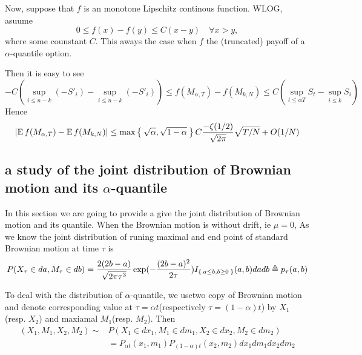 \documentclass[11pt]{book}
\def\abs#1{{\left|#1\right|}}
\def\E{{\mathrm{E}\,}}
\begin{document}
Now, suppose that $f$ is an monotone Lipschitz continous function.
WLOG, asuume 
\begin{equation}\label{eq:lips}
0 \leq f(x)-f(y) \leq C (x-y) \quad \forall x>y,
\end{equation}
where some counstant $C$. This aways the case when $f$ the 
(truncated) payoff of a $\alpha$-quantile option.

Then it is easy to see
\[
-C\left( \sup_{i\leq n-k} (-S'_i)-\sup_{i\leq n-k} (-S'_i)\right)
 \leq f(M_{\alpha,T}) - f(M_{k,N}) 
\leq  C \left(\sup_{t\leq \alpha{T}} S_t - \sup_{i\leq k} S_i\right)
\]
Hence 
\[
\abs{\E f(M_{\alpha,T}) - \E f(M_{k,N})} 
\leq \max\Set{\sqrt{\alpha}, \sqrt{1-\alpha}}
C\frac{-\zeta(1/2)}{\sqrt{2\pi}}\sqrt{T/N}  + O(1/N)
\]


\subsection{a study of the joint distribution of Brownian motion and its $\alpha$-quantile}
In this section we are going to provide a give the joint distribution of Brownian motion and its quantile. When the Brownian motion is without drift, 
ie $\mu = 0 $, 
As we know the joint distribution of runing maximal and end point of 
standard Brownian motion at time $\tau$ is 
\[
P(X_\tau\in da, M_\tau\in db) =  
\frac{2(2b-a)}{\sqrt{2\pi \tau^3}} \exp(-\frac{(2b-a)^2}{2\tau}) 
I_{\Set{a\leq b, b\geq 0}} (a,b) da db \triangleq p_\tau(a,b)
\] 

To deal with the distribution of $\alpha$-quantile, we usetwo copy of 
Brownian motion and denote corresponding value at 
$\tau=\alpha t$(respectively $\tau=(1-\alpha) t$) by $X_1$(resp. $X_2$) and
maxiamal $M_1$(resp. $M_2$). 
Then 
\[
\begin{split}
(X_1,M_1, X_2, M_2) \sim& P(X_1\in dx_1, M_1\in dm_1, X_2\in dx_2, M_2\in dm_2)\\
&= P_{\alpha t}(x_1, m_1) P_{(1-\alpha)t}(x_2,m_2) dx_1dm_1dx_2dm_2
\end{split}
\] 
\end{document}
